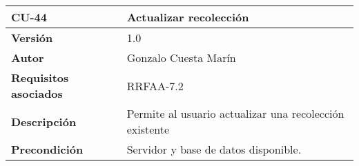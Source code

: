 \begin{longtable}[]{@{}ll@{}}
\toprule
\begin{minipage}[b]{0.22\columnwidth}\raggedright
\textbf{CU-44}\strut
\end{minipage} & \begin{minipage}[b]{0.72\columnwidth}\raggedright
\textbf{Actualizar recolección}\strut
\end{minipage}\tabularnewline
\midrule
\endhead
\begin{minipage}[t]{0.22\columnwidth}\raggedright
\textbf{Versión}\strut
\end{minipage} & \begin{minipage}[t]{0.72\columnwidth}\raggedright
1.0\strut
\end{minipage}\tabularnewline
\begin{minipage}[t]{0.22\columnwidth}\raggedright
\textbf{Autor}\strut
\end{minipage} & \begin{minipage}[t]{0.72\columnwidth}\raggedright
Gonzalo Cuesta Marín\strut
\end{minipage}\tabularnewline
\begin{minipage}[t]{0.22\columnwidth}\raggedright
\textbf{Requisitos asociados}\strut
\end{minipage} & \begin{minipage}[t]{0.72\columnwidth}\raggedright
RRFAA-7.2\strut
\end{minipage}\tabularnewline
\begin{minipage}[t]{0.22\columnwidth}\raggedright
\textbf{Descripción}\strut
\end{minipage} & \begin{minipage}[t]{0.72\columnwidth}\raggedright
Permite al usuario actualizar una recolección existente\strut
\end{minipage}\tabularnewline
\begin{minipage}[t]{0.22\columnwidth}\raggedright
\textbf{Precondición}\strut
\end{minipage} & \begin{minipage}[t]{0.72\columnwidth}\raggedright
Servidor y base de datos disponible.


\end{minipage}
\end{longtable}
